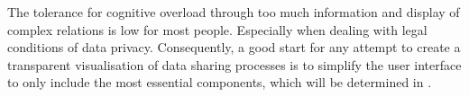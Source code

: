 \documentclass[../paper.tex]{subfiles}
\begin{document}
  The tolerance for cognitive overload through too much information and display 
  of complex relations is low for most people. Especially when dealing with 
  legal conditions of data privacy. Consequently, a good start for any attempt
  to create a transparent visualisation of data sharing processes is to simplify
  the user interface to only include the most essential components, which will
  be determined in .
\end{document}
